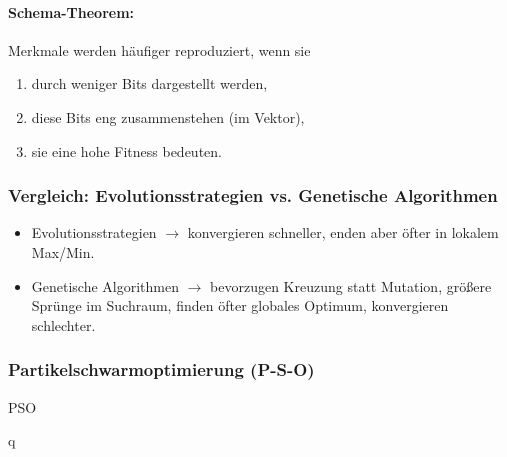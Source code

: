 \paragraph{Schema-Theorem:} Merkmale werden häufiger reproduziert, wenn sie 
\begin{enumerate}
	\item durch weniger Bits dargestellt werden,
	\item diese Bits eng zusammenstehen (im Vektor),
	\item sie eine hohe Fitness bedeuten.
\end{enumerate}

\subsubsection{Vergleich: Evolutionsstrategien vs. Genetische Algorithmen}
\begin{itemize}
	\item Evolutionsstrategien $\rightarrow$ konvergieren schneller, enden aber öfter in lokalem Max/Min.\\
	\item Genetische Algorithmen $\rightarrow$ bevorzugen Kreuzung statt Mutation, größere Sprünge im Suchraum, finden öfter globales Optimum, konvergieren schlechter.
\end{itemize}

\subsubsection{Partikelschwarmoptimierung (P-S-O)}
\begin{algorithm}[H]
	\caption{PSO}
        
        \BlankLine

        \BlankLine
        
        \Return q\\
\end{algorithm}


